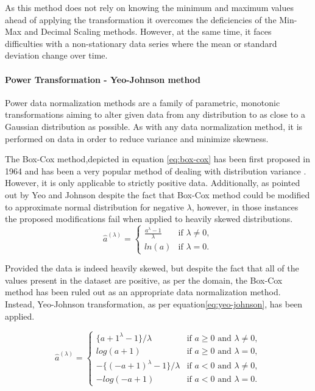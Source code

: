 As this method does not rely on knowing the minimum and maximum values ahead of applying the transformation it overcomes the deficiencies of the Min-Max and Decimal Scaling methods\cite{dataNormalization2014}. However, at the same time, it faces difficulties with a non-stationary data series where the mean or standard deviation change over time.

\paragraph{Power Transformation - Yeo-Johnson method} \label{sec:data-modelling:scalers:power-yeo-johnson}
Power data normalization methods are a family of parametric, monotonic transformations aiming to alter given data from any distribution to as close to a Gaussian distribution as possible. As with any data normalization method, it is performed on data in order to reduce variance and minimize skewness.

The Box-Cox method,depicted in equation \ref{eq:box-cox} has been first proposed in 1964\cite{boxCox1964} and has been a very popular method of dealing with distribution variance \cite{YANG200614}. However, it is only applicable to strictly positive data\cite{YANG200614}. 
Additionally, as pointed out by Yeo and Johnson \cite{yeo-johnson-original} despite the fact that Box-Cox method could be modified to approximate normal distribution for negative $\lambda$, however, in those instances the proposed modifications fail when applied to heavily skewed distributions.
\begin{equation}\label{eq:box-cox}
    \hat{a}^{(\lambda)}=\begin{cases} \frac {{a}^{\lambda } - 1 }{\lambda}& \text{if $\lambda \neq 0$},\\
    ln(a)& \text{if $\lambda=0$}.
\end{cases}
\end{equation}

Provided the data is indeed heavily skewed, but despite the fact that all of the values present in the dataset are positive, as per the domain, the Box-Cox method has been ruled out as an appropriate data normalization method. Instead, Yeo-Johnson transformation, as per equation\ref{eq:yeo-johnson}, has been applied.

\begin{equation}\label{eq:yeo-johnson}
    \hat{a}^{(\lambda)}=\begin{cases} {\{{a +1}^{\lambda } - 1 }\}/ {\lambda}& \text{if $a \geq 0$ and $\lambda \neq 0$},\\
    log(a+1)& \text{if $a\geq 0$ and $\lambda=0$},\\
    -\{(-a +1)^\lambda -1\}/\lambda & \text{if $a < 0$ and $\lambda \neq 0$},\\
    -log(-a +1) & \text{if $a < 0$ and $\lambda = 0$}.
    
\end{cases}
\end{equation}

